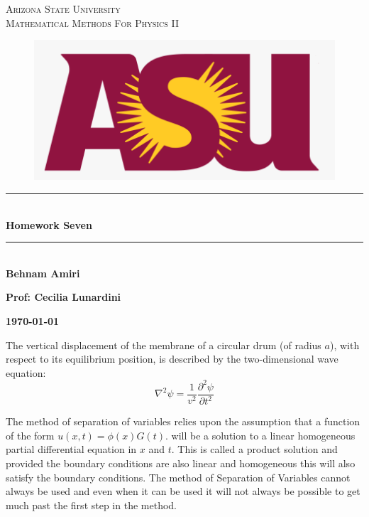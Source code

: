 \documentclass[fleqn]{article}
\begin{document}
  \begin{titlepage}

    \newcommand{\HRule}{\rule{\linewidth}{0.5mm}}

    \center


    \textsc{\LARGE Arizona State University}\\[1.5cm]

    \textsc{\LARGE Mathematical Methods For Physics II }\\[1.5cm]


    \begin{figure}
      \includegraphics[width=\linewidth]{asu.png}
    \end{figure}


    \HRule \\[0.4cm]
    { \huge \bfseries Homework Seven}\\[0.4cm] 
    \HRule \\[1.5cm]

    \textbf{Behnam Amiri}

    \bigbreak

    \textbf{Prof: Cecilia Lunardini}

    \bigbreak


    \textbf{{\large \today}\\[2cm]}

    \vfill

  \end{titlepage}

  The vertical displacement of the membrane of a circular drum (of radius $a$), with respect to its equilibrium position, is described by the two-dimensional wave equation: 
  $$
  \nabla^2 \psi = \frac{1}{v^2} \frac{\partial ^2 \psi}{\partial t^2}
  $$

  \textcolor{hwColor}{
    The method of separation of variables relies upon the assumption that a function of the form $u(x,t)=\phi(x) G(t)$. 
    will be a solution to a linear homogeneous partial differential equation in $x$ and $t$. This is called a product solution
    and provided the boundary conditions are also linear and homogeneous this will also satisfy the boundary conditions.
    The method of Separation of Variables cannot always be used and even when it can be used 
    it will not always be possible to get much past the first step in the method. \\
  }
\end{document}
